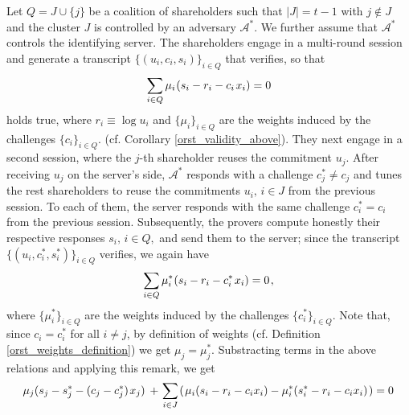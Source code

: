\documentclass[10pt, psamsfonts, reqno]{amsart}
\theoremstyle{definition}
\theoremstyle{remark}
\numberwithin{equation}{section}
\begin{document}
Let $Q = J \cup \{j\}$ be a coalition of shareholders
such that $|J| = t-1$ with $j \not \in J$
and the cluster $J$ is controlled by an adversary $\mathcal{A}^*$.
We further assume that $\mathcal{A}^*$
controls the identifying server.
The shareholders engage in a multi-round
session and generate a transcript $\{(u_i, c_i, s_i)\}_{i \in Q}$
that verifies, so that
\vspace{5pt}
\begin{equation*}
\sum_{i \in Q}
\mu_i\hspace{0.5pt} (s_i - r_i - c_i\hspace{1pt}x_i)
=
0
\vspace{5pt}
\end{equation*}
holds true,
where $r_i \equiv \log u_i$
and $\{\mu_i\}_{i \in Q}$ are the weights
induced by the challenges $\{c_i\}_{i \in Q}$.
(cf. Corollary \ref{orst_validity_above}).
They next engage in a second session,
where the $j$-th shareholder reuses the commitment $u_j$.
After receiving $u_j$ on the server's side,
$\mathcal{A}^*$ responds with a challenge $c_j^* \neq c_j$
and tunes the rest shareholders to
reuse the commitments $u_i,\hspace{2pt} i \in J$
from the previous session. To each of them,
the server responds with the same challenge
$c_i^* = c_i$
from the previous session.
Subsequently, the provers compute honestly their respective
responses $s_i,\hspace{2pt} i \in Q,$
and send them to the server;
since the transcript $\{(u_i, c_i^*, s_i^*)\}_{i \in Q}$
verifies, we again have
\vspace{5pt}
\begin{equation*}
\sum_{i \in Q}
\mu_i^*\hspace{0.5pt} (s_i - r_i - c_i^*\hspace{1pt}x_i)
=
0\hspace{1pt},
\vspace{5pt}
\end{equation*}
where $\{\mu_i^*\}_{i \in Q}$ are the weights induced
by the challenges $\{c_i^*\}_{i \in Q}$.
Note that,
since $c_i = c_i^*$ for all $i \neq j$,
by definition of weights
(cf. Definition \ref{orst_weights_definition})
we get $\mu_j = \mu_j^*$.
Substracting terms in the above relations and applying this remark,
we get
\vspace{5pt}
\begin{equation*}
\mu_j (s_j - s_j^* - (c_j - c_j^*)\hspace{1pt} x_j)
\hspace{2pt}
+
\hspace{1pt}
\sum_{i \in J}\hspace{1pt}
(
\hspace{1pt}
\mu_i (s_i - r_i - c_i x_i)
-
\mu_i^* (s_i^* - r_i - c_i x_i)
\hspace{1pt}
)
=
0\hspace{1pt}
\vspace{5pt}
\end{equation*}
\end{document}
